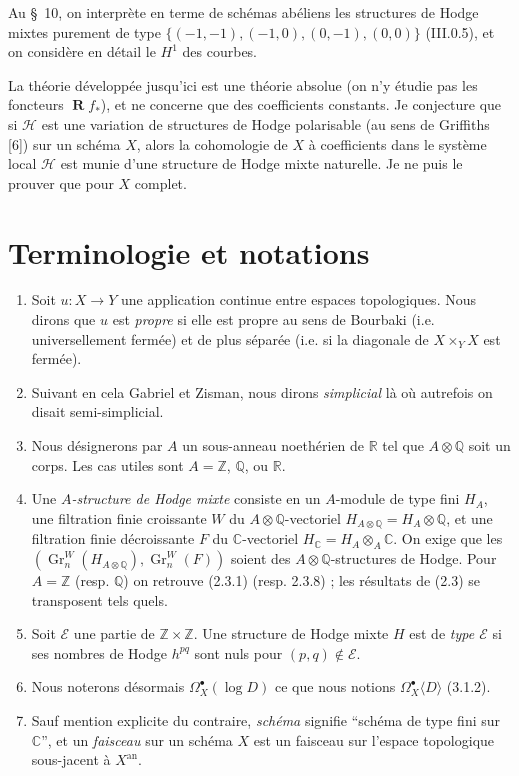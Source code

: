 \documentclass[11pt]{amsart}
\theoremstyle{plain}
\theoremstyle{definition}
\DeclareMathOperator{\Gr}{Gr}
\DeclareMathOperator{\Rd}{\mathbf{R}}
\newcommand{\CC}{\mathbb{C}}
\newcommand{\QQ}{\mathbb{Q}}
\newcommand{\RR}{\mathbb{R}}
\newcommand{\ZZ}{\mathbb{Z}}
\begin{document}
Au \S\ 10, on interpr\`ete en terme de sch\'emas ab\'eliens les structures de Hodge mixtes
purement de type $\{(-1,-1), (-1,0), (0,-1), (0,0)\}$ (III.0.5), et on consid\`ere en
d\'etail le $H^1$ des courbes.

La th\'eorie d\'evelopp\'ee jusqu'ici est une th\'eorie absolue (on n'y \'etudie pas les
foncteurs $\Rd f_*$), et ne concerne que des coefficients constants. Je conjecture que si $\mathscr{H}$
est une variation de structures de Hodge polarisable (au sens de Griffiths [6]) sur un
sch\'ema $X$, alors la cohomologie de $X$ \`a coefficients dans le syst\`eme local $\mathscr{H}$ est munie
d'une structure de Hodge mixte naturelle. Je ne puis le prouver que pour $X$ complet.

\section*{Terminologie et notations}

\begin{enumerate}
\item[(III.0.1)] Soit $u : X \to Y$ une application continue entre espaces topologiques.
Nous dirons que $u$ est \emph{propre} si elle est propre au sens de Bourbaki (i.e. universellement
ferm\'ee) et de plus s\'epar\'ee (i.e. si la diagonale de $X \times_Y X$ est ferm\'ee).

\item[(III.0.2)] Suivant en cela Gabriel et Zisman, nous dirons \emph{simplicial} l\`a o\`u autrefois
on disait semi-simplicial.

\item[(III.0.3)] Nous d\'esignerons par $A$ un sous-anneau noeth\'erien de $\RR$ tel que $A \otimes \QQ$
soit un corps. Les cas utiles sont $A = \ZZ$, $\QQ$, ou $\RR$.

\item[(III.0.4)] Une \emph{$A$-structure de Hodge mixte} consiste en un $A$-module de type fini $H_A$,
une filtration finie croissante $W$ du $A \otimes \QQ$-vectoriel $H_{A \otimes \QQ} = H_A \otimes \QQ$, et une filtration
finie d\'ecroissante $F$ du $\CC$-vectoriel $H_\CC = H_A \otimes_A \CC$. On exige que les $(\Gr_n^W(H_{A \otimes \QQ}), \Gr_n^W(F))$
soient des $A \otimes \QQ$-structures de Hodge. Pour $A = \ZZ$ (resp. $\QQ$) on retrouve (2.3.1) (resp.
2.3.8) ; les r\'esultats de (2.3) se transposent tels quels.

\item[(III.0.5)] Soit $\mathscr{E}$ une partie de $\ZZ \times \ZZ$. Une structure de Hodge mixte $H$ est de
\emph{type $\mathscr{E}$} si ses nombres de Hodge $h^{pq}$ sont nuls pour $(p,q) \notin \mathscr{E}$.

\item[(III.0.6)] Nous noterons d\'esormais $\Omega_X^\bullet(\log D)$ ce que nous notions $\Omega_X^\bullet\langle D\rangle$ (3.1.2).

\item[(III.0.7)] Sauf mention explicite du contraire, \emph{sch\'ema} signifie ``sch\'ema de type
fini sur $\CC$'', et un \emph{faisceau} sur un sch\'ema $X$ est un faisceau sur l'espace topologique
sous-jacent \`a $X^{\mathrm{an}}$.
\end{enumerate}
\end{document}

